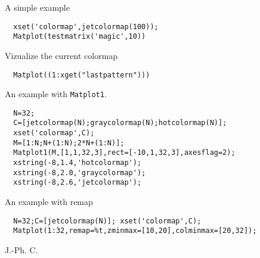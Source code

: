 \begin{examples}

\noindent A simple example

\begin{Verbatim}
  xset('colormap',jetcolormap(100));
  Matplot(testmatrix('magic',10))
\end{Verbatim}

\noindent Vizualize the current colormap

\begin{Verbatim}
  Matplot((1:xget("lastpattern")))
\end{Verbatim}

\noindent An example with \verb!Matplot1!.

\begin{Verbatim}
  N=32;
  C=[jetcolormap(N);graycolormap(N);hotcolormap(N)];
  xset('colormap',C);
  M=[1:N;N+(1:N);2*N+(1:N)];
  Matplot1(M,[1,1,32,3],rect=[-10,1,32,3],axesflag=2);
  xstring(-8,1.4,'hotcolormap');
  xstring(-8,2.0,'graycolormap');
  xstring(-8,2.6,'jetcolormap');
\end{Verbatim}

\noindent An example with remap

\begin{Verbatim}
  N=32;C=[jetcolormap(N)]; xset('colormap',C);
  Matplot(1:32,remap=%t,zminmax=[10,20],colminmax=[20,32]);
\end{Verbatim}
\end{examples}
\begin{manseealso}
\end{manseealso}
\begin{authors}
  J.-Ph. C.
\end{authors}
